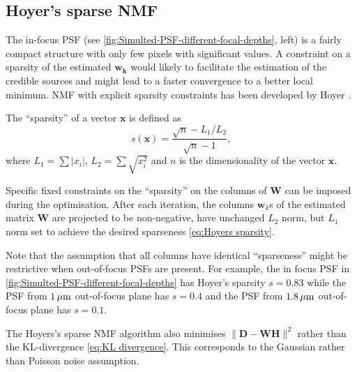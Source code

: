 \subsection{Hoyer's sparse NMF \label{sub:Hoyer}}
The in-focus PSF (see \autoref{fig:Simulted-PSF-different-focal-depths}, left) is a fairly compact structure with only few pixels with significant values. A constraint on a sparsity of the estimated $\bm{w_{k}}$ would likely to facilitate the estimation of the credible sources and might lead to a faster convergence to a better local minimum. NMF with explicit sparsity constraints has been developed by Hoyer  \cite{Hoyer2004}. 

The ``sparsity'' of a vector $\bm{x}$ is defined as 
%
\begin{equation}
	s(\bm{x})=\frac{\sqrt{n}-L_{1}/L_{2}}{\sqrt{n}-1},
	\label{eq:Hoyers sparsity}
\end{equation}
%
where $L_{1}=\sum|x_{i}|$, $L_{2}=\sum \sqrt{x^{2}_{i}}$ and $n$ is the dimensionality of the vector $\bm{x}$.

Specific fixed constraints on the ``sparsity'' on the columns of $\bm{W}$ can be imposed during the optimisation. After each iteration, the columns $\bm{w}_{k}$s of the estimated matrix $\bm{W}$ are projected to be non-negative, have unchanged $L_{2}$ norm, but $L_{1}$ norm set to achieve the desired sparseness \autoref{eq:Hoyers sparsity}.

Note that the assumption that all columns have identical ``sparseness'' might be restrictive when out-of-focus PSFs are present. For example, the in focus PSF in \autoref{fig:Simulted-PSF-different-focal-depths} has Hoyer's sparsity $s=0.83$ while the PSF from $1 \, \mathrm{\mu m}$ out-of-focus plane has $s=0.4$ and the PSF from $1.8 \, \mathrm{\mu m}$ out-of-focus plane  has $s=0.1$.

The Hoyers's sparse NMF algorithm also minimises $\|\bm{D} - \bm{WH}\|^{2}$ rather than the KL-divergence \autoref{eq:KL divergence}. This corresponds to the Gaussian rather than Poisson noise assumption. 

